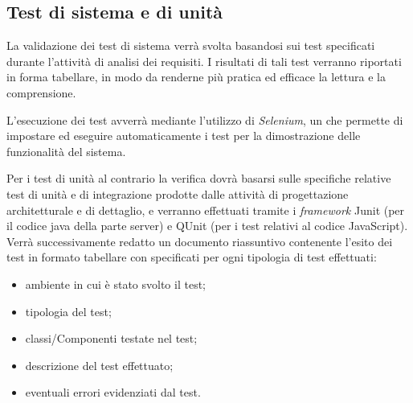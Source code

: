 {\subsection{Test di sistema e di unità}
La validazione dei test di sistema verrà svolta basandosi sui test specificati durante l'attività di analisi dei requisiti. I risultati di tali test verranno riportati in forma tabellare, in modo da renderne più pratica ed efficace la lettura e la comprensione.

L'esecuzione dei test avverrà mediante l'utilizzo di \textit{Selenium}, un  che permette di impostare ed eseguire automaticamente i test per la dimostrazione delle funzionalità del sistema.

Per i test di unità al contrario la verifica dovrà basarsi sulle specifiche relative test di unità e di integrazione prodotte dalle attività di progettazione architetturale e di dettaglio, e verranno effettuati tramite i \textit{framework} Junit (per il codice java della parte server) e QUnit (per i test relativi al codice JavaScript).\\
Verrà successivamente redatto un documento riassuntivo contenente l'esito dei test in formato tabellare con specificati per ogni tipologia di test effettuati:
\begin{itemize}
\item ambiente in cui è stato svolto il test;
\item tipologia del test;
\item classi/Componenti testate nel test;
\item descrizione del test effettuato;
\item eventuali errori evidenziati dal test.
\end{itemize}

}
